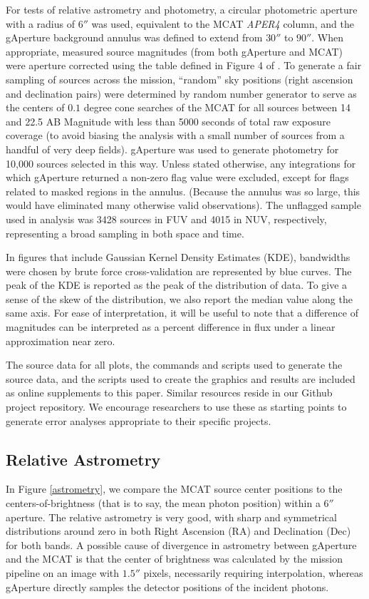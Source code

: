 \documentclass[preprint]{aastex}
\begin{document}
For tests of relative astrometry and photometry, a circular photometric aperture with a radius of $6''$ was used, equivalent to the MCAT \emph{APER4} column, and the gAperture background annulus was defined to extend from $30''$ to $90''$. When appropriate, measured source magnitudes (from both gAperture and MCAT) were aperture corrected using the table defined in Figure 4 of \cite{mor2007}. To generate a fair sampling of sources across the mission, ``random''  sky positions (right ascension and declination pairs) were determined by random number generator to serve as the centers of $0.1$ degree cone searches of the MCAT for all sources between 14 and 22.5 AB Magnitude with less than 5000 seconds of total raw exposure coverage (to avoid biasing the analysis with a small number of sources from a handful of very deep fields). gAperture was used to generate photometry for 10,000 sources selected in this way. Unless stated otherwise, any integrations for which gAperture returned a non-zero flag value were excluded, except for flags related to masked regions in the annulus. (Because the annulus was so large, this would have eliminated many otherwise valid observations). The unflagged sample used in analysis was 3428 sources in FUV and 4015 in NUV, respectively, representing a broad sampling in both space and time.

In figures that include Gaussian Kernel Density Estimates (KDE), bandwidths were chosen by brute force cross-validation are represented by blue curves. The peak of the KDE is reported as the peak of the distribution of data. To give a sense of the skew of the distribution, we also report the median value along the same axis. For ease of interpretation, it will be useful to note that a difference of magnitudes can be interpreted as a percent difference in flux under a linear approximation near zero.

The source data for all plots, the commands and scripts used to generate the source data, and the scripts used to create the graphics and results are included as online supplements to this paper. Similar resources reside in our Github project repository. We encourage researchers to use these as starting points to generate error analyses appropriate to their specific projects.

\subsection{Relative Astrometry}
In Figure \ref{astrometry}, we compare the MCAT source center positions to the centers-of-brightness (that is to say, the mean photon position) within a $6''$ aperture. The relative astrometry is very good, with sharp and symmetrical distributions around zero in both Right Ascension (RA) and Declination (Dec) for both bands. A possible cause of divergence in astrometry between gAperture and the MCAT is that the center of brightness was calculated by the mission pipeline on an image with $1.5''$ pixels, necessarily requiring interpolation, whereas gAperture directly samples the detector positions of the incident photons.
\end{document}

